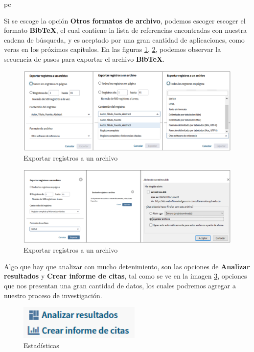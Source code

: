 pc\documentclass[a4paper,12pt,openany]{book}
\begin{document}
\begin{itemize}
Si se escoge la opción \textbf{Otros formatos de archivo}, podemos escoger escoger el formato \textbf{BibTeX}, el cual contiene la lista de referencias encontradas con nuestra cadena de búsqueda, y es aceptado por una gran cantidad de aplicaciones, como veras en los próximos capítulos. En las figuras \ref{fig:WOS12}, \ref{fig:WOS13}, podemos observar la secuencia de pasos para exportar el archivo \textbf{BibTeX}. 

    \begin{figure}[H]
    \centering
	\includegraphics[width=12cm]{Wos12.png}
    \caption{Exportar registros a un archivo}
    \label{fig:WOS12}
    \end{figure}

    \begin{figure}[H]
    \centering
	\includegraphics[width=12cm]{Wos13.png}
    \caption{Exportar registros a un archivo}
    \label{fig:WOS13}
    \end{figure}

Algo que hay que analizar con mucho detenimiento, son las opciones de \textbf{Analizar resultados} y \textbf{Crear informe de citas}, tal como se ve en la imagen \ref{fig:WOS14}, opciones que nos presentan una gran cantidad de datos, los cuales podremos agregar a nuestro proceso de investigación.

    \begin{figure}[H]
    \centering
	\includegraphics[width=6cm]{Wos14.png}
    \caption{Estadísticas}
    \label{fig:WOS14}
    \end{figure}


\end{itemize}
\end{document}
